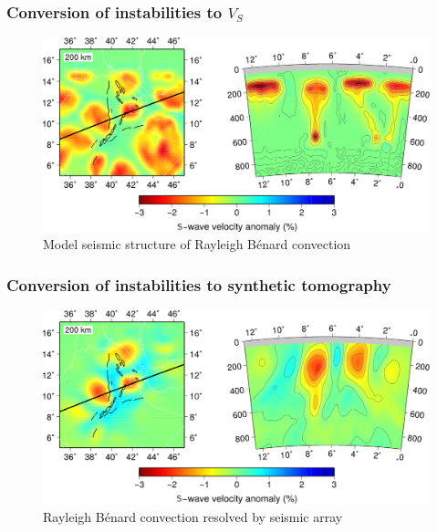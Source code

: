 \documentclass[aspectratio=169]{beamer}
\begin{document}
\begin{frame}
    \frametitle{Conversion of instabilities to $V_{S}$}
    \begin{figure}
        \includegraphics[width=0.85\paperwidth]{./figures/Newt200/input.png}
        \caption{Model seismic structure of Rayleigh B{\'e}nard convection}
    \end{figure}
\end{frame}

\begin{frame}
    \frametitle{Conversion of instabilities to synthetic tomography}
    \begin{figure}
        \includegraphics[width=0.85\paperwidth]{./figures/Newt200/output_damp.png}
        \caption{Rayleigh B{\'e}nard convection resolved by seismic array}
    \end{figure}
\end{frame}
\end{document}
